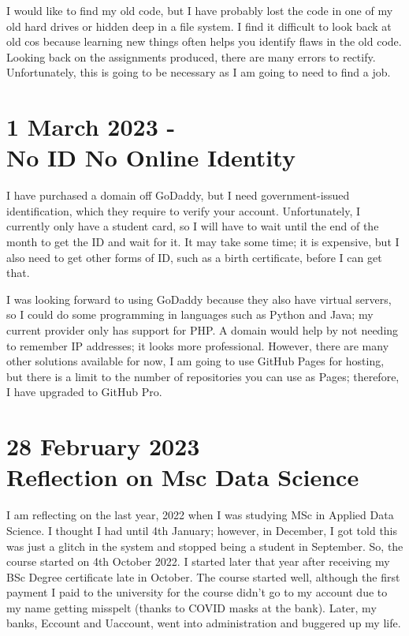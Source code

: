 \documentclass{article}
\begin{document}
I would like to find my old code, but I have probably lost the code in one of my old hard drives or hidden deep in a file system. I find it difficult to look back at old cos because learning new things often helps you identify flaws in the old code. Looking back on the assignments produced, there are many errors to rectify. Unfortunately, this is going to be necessary as I am going to need to find a job.

 \newpage


\section*{1 March 2023 - \\No ID No Online Identity}

I have purchased a domain off GoDaddy, but I need government-issued identification, which they require to verify your account. Unfortunately, I currently only have a student card, so I will have to wait until the end of the month to get the ID and wait for it. It may take some time; it is expensive, but I also need to get other forms of ID, such as a birth certificate, before I can get that. 

I was looking forward to using GoDaddy because they also have virtual servers, so I could do some programming in languages such as Python and Java; my current provider only has support for PHP. A domain would help by not needing to remember IP addresses; it looks more professional. However, there are many other solutions available for now, I am going to use GitHub Pages for hosting, but there is a limit to the number of repositories you can use as Pages; therefore, I have upgraded to GitHub Pro.

\newpage
\section*{28 February 2023 \\ Reflection on Msc Data Science}


I am reflecting on the last year, 2022 when I was studying MSc in Applied Data Science. I thought I had until 4th January; however, in December, I got told this was just a glitch in the system and stopped being a student in September. So, the course started on 4th October 2022. I started later that year after receiving my BSc Degree certificate late in October. The course started well, although the first payment I paid to the university for the course didn't go to my account due to my name getting misspelt (thanks to COVID masks at the bank). Later, my banks, Eccount and Uaccount, went into administration and buggered up my life.
\end{document}
